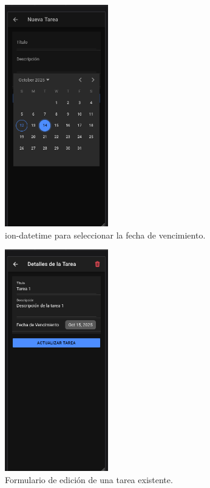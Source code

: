 \documentclass{article}
\begin{document}
\begin{figure}[htbp]
\centering
\includegraphics[width=0.4\textwidth]{captura_fecha.png}
\caption{ion-datetime para seleccionar la fecha de vencimiento.}
\label{fig:datetime}
\end{figure}
\begin{figure}[htbp]
\centering
\includegraphics[width=0.4\textwidth]{captura_detalles.png}
\caption{Formulario de edici\'on de una tarea existente.}
\label{fig:detalles}
\end{figure}
\end{document}
